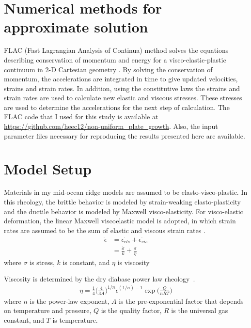 \documentclass[letterpaper,12pt,notitle]{memphisthesis}                     %
\begin{document}
\section{ Numerical methods for approximate solution}
FLAC (Fast Lagrangian Analysis of Continua) method \citep{Cundall1982, Poliakov1993} solves the equations describing conservation of momentum and energy for a visco-elastic-plastic continuum in 2-D Cartesian geometry \citep{Lavier2002}. By solving the conservation of momentum, the accelerations are integrated in time to give updated velocities, strains and strain rates. In addition, using the constitutive laws the strains and strain rates are used to calculate new elastic and viscous stresses. These stresses are used to determine the accelerations for the next step of calculation. The FLAC code that I used for this study is available at \url{https://github.com/heec12/non-uniform_plate_growth}. Also, the input parameter files necessary for reproducing the results presented here are available.

\section{Model Setup}
Materials in my mid-ocean ridge models are assumed to be elasto-visco-plastic. In this rheology, the brittle behavior is modeled by strain-weaking elasto-plasticity and the ductile behavior is modeled by Maxwell visco-elasticity. 
For visco-elastic deformation, the linear Maxwell viscoelastic model is adopted, in which strain rates are assumed to be the sum of elastic and viscous strain rates .
\begin{align} \label{srate}
  \dot{\epsilon} &=  \dot{\epsilon_{els}} +  \dot{\epsilon_{vis}} \\
                        &= \frac{ \dot{\sigma}}{k} + \frac{\sigma}{\eta}
\end{align}
where $\sigma$ is stress, $k$ is constant, and $\eta$ is viscosity 

%
Viscosity is determined by the dry diabase power law rheology~\citep{Kirby1987, Chen1990}.
\begin{align} \label{Visc}
 \eta = \frac{1}{4} \bigg( \frac{4}{3A} \bigg)^{1/n} \dot{\epsilon}^{(1/n)-1} \exp\bigg(\frac{Q}{nRT}\bigg)
\end{align}
where $n$ is the power-law exponent, $A$ is the pre-exponential factor that depends on temperature and pressure, $Q$ is the quality factor, $R$ is the universal gas constant, and $T$ is temperature.
%
\end{document}
